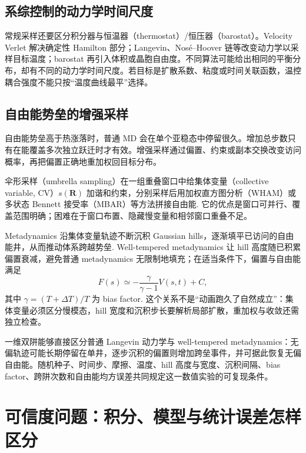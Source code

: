 \documentclass[UTF8,10pt,a4paper,fontset=none]{ctexart}
\begin{document}
\subsection{系综控制的动力学时间尺度}

常规采样还要区分积分器与恒温器（thermostat）/恒压器（barostat）。Velocity Verlet 解决确定性 Hamilton 部分；Langevin、Nos\'e--Hoover 链等改变动力学以采样目标温度；barostat 再引入体积或晶胞自由度。不同算法可能给出相同的平衡分布，却有不同的动力学时间尺度。若目标是扩散系数、粘度或时间关联函数，温控耦合强度不能只按“温度曲线最平”选择。

\subsection{自由能势垒的增强采样}

自由能势垒高于热涨落时，普通 MD 会在单个亚稳态中停留很久。增加总步数只有在能覆盖多次独立跃迁时才有效。增强采样通过偏置、约束或副本交换改变访问概率，再把偏置正确地重加权回目标分布。

伞形采样（umbrella sampling）在一组重叠窗口中给集体变量（collective variable, CV）$s(\bm R)$ 加谐和约束，分别采样后用加权直方图分析（WHAM）或多状态 Bennett 接受率（MBAR）等方法拼接自由能\cite{torrie1977}. 它的优点是窗口可并行、覆盖范围明确；困难在于窗口布置、隐藏慢变量和相邻窗口重叠不足。

Metadynamics 沿集体变量轨迹不断沉积 Gaussian hills，逐渐填平已访问的自由能井，从而推动体系跨越势垒\cite{laio2002}. Well-tempered metadynamics 让 hill 高度随已积累偏置衰减，避免普通 metadynamics 无限制地填充；在适当条件下，偏置与自由能满足
\begin{equation}
  F(s)\simeq-\frac{\gamma}{\gamma-1}V(s,t)+C,
\end{equation}
其中 $\gamma=(T+\Delta T)/T$ 为 bias factor\cite{barducci2008}. 这个关系不是“动画跑久了自然成立”：集体变量必须区分慢模态，hill 宽度和沉积步长要解析局部扩散，重加权与收敛还需独立检查。

一维双阱能够直接区分普通 Langevin 动力学与 well-tempered metadynamics：无偏轨迹可能长期停留在单井，逐步沉积的偏置则增加跨垒事件，并可据此恢复无偏自由能。随机种子、时间步、摩擦、温度、hill 高度与宽度、沉积间隔、bias factor、跨阱次数和自由能均方误差共同规定这一数值实验的可复现条件。

\section{可信度问题：积分、模型与统计误差怎样区分}
\end{document}
